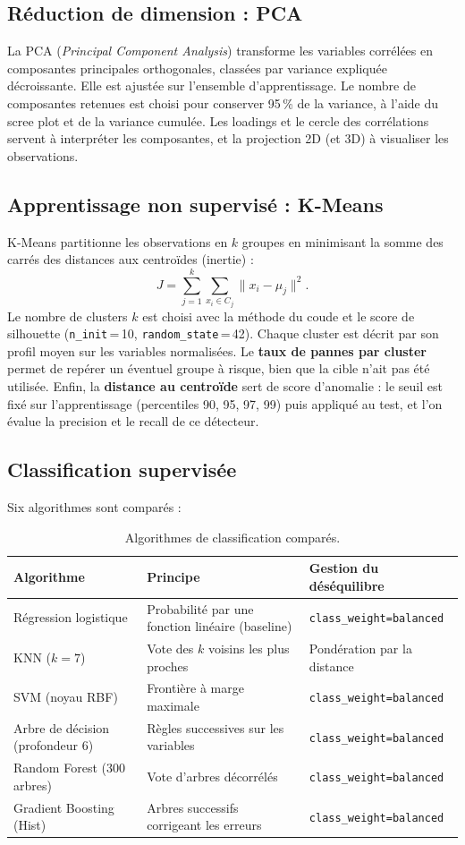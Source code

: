 \documentclass[12pt,a4paper]{article}
\begin{document}
\subsection{Réduction de dimension : PCA}
La PCA (\emph{Principal Component Analysis}) transforme les variables corrélées en composantes principales orthogonales, classées par variance expliquée décroissante. Elle est ajustée sur l'ensemble d'apprentissage. Le nombre de composantes retenues est choisi pour conserver 95\,\% de la variance, à l'aide du scree plot et de la variance cumulée. Les loadings et le cercle des corrélations servent à interpréter les composantes, et la projection 2D (et 3D) à visualiser les observations.

\subsection{Apprentissage non supervisé : K-Means}
K-Means partitionne les observations en $k$ groupes en minimisant la somme des carrés des distances aux centroïdes (inertie) :
\[
J = \sum_{j=1}^{k} \sum_{x_i \in C_j} \lVert x_i - \mu_j \rVert^2 .
\]
Le nombre de clusters $k$ est choisi avec la méthode du coude et le score de silhouette (\texttt{n\_init}\,=\,10, \texttt{random\_state}\,=\,42). Chaque cluster est décrit par son profil moyen sur les variables normalisées. Le \textbf{taux de pannes par cluster} permet de repérer un éventuel groupe à risque, bien que la cible n'ait pas été utilisée. Enfin, la \textbf{distance au centroïde} sert de score d'anomalie : le seuil est fixé sur l'apprentissage (percentiles 90, 95, 97, 99) puis appliqué au test, et l'on évalue la precision et le recall de ce détecteur.

\subsection{Classification supervisée}
Six algorithmes sont comparés :

\begin{table}[H]
\centering
\small
\begin{tabularx}{\textwidth}{@{}l X X@{}}
\toprule
\textbf{Algorithme} & \textbf{Principe} & \textbf{Gestion du déséquilibre} \\
\midrule
Régression logistique & Probabilité par une fonction linéaire (baseline) & \texttt{class\_weight=balanced} \\
KNN ($k=7$) & Vote des $k$ voisins les plus proches & Pondération par la distance \\
SVM (noyau RBF) & Frontière à marge maximale & \texttt{class\_weight=balanced} \\
Arbre de décision (profondeur 6) & Règles successives sur les variables & \texttt{class\_weight=balanced} \\
Random Forest (300 arbres) & Vote d'arbres décorrélés & \texttt{class\_weight=balanced} \\
Gradient Boosting (Hist) & Arbres successifs corrigeant les erreurs & \texttt{class\_weight=balanced} \\
\bottomrule
\end{tabularx}
\caption{Algorithmes de classification comparés.}
\end{table}
\end{document}
